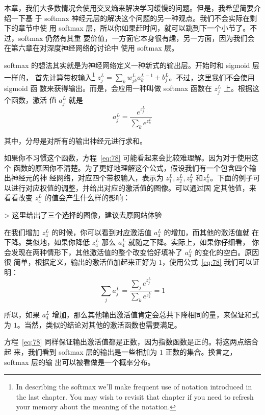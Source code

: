 本章，我们大多数情况会使用交叉熵来解决学习缓慢的问题。但是，我希望简要介绍一下基
于 softmax 神经元层的解决这个问题的另一种观点。我们不会实际在剩下的章节中使
用 softmax 层，所以你如果赶时间，就可以跳到下一个小节了。不过，softmax 仍然有其重
要价值，一方面它本身很有趣，另一方面，因为我们会在第六章在对深度神经网络的讨论中
使用 softmax 层。

softmax 的想法其实就是为神经网络定义一种新式的输出层。开始时和 sigmoid 层一样的，
首先计算带权输入\footnote{In describing the softmax we'll make frequent use of
  notation introduced in the last chapter. You may wish to revisit that chapter
  if you need to refresh your memory about the meaning of the notation.}
$z^L_j = \sum_{k} w^L_{jk} a^{L-1}_k + b^L_j$。不过，这里我们不会使用 sigmoid 函
数来获得输出。而是，会应用一种叫做 softmax 函数在 $z^L_j$ 上。根据这个函数，激活
值 $a^L_j$ 就是
\begin{equation} 
  a^L_j = \frac{e^{z^L_j}}{\sum_k e^{z^L_k}}
  \label{eq:78}\tag{78}
\end{equation}

其中，分母是对所有的输出神经元进行求和。

如果你不习惯这个函数，方程~\eqref{eq:78} 可能看起来会比较难理解。因为对于使用这个
函数的原因你不清楚。为了更好地理解这个公式，假设我们有一个包含四个输出神经元的神
经网络，对应四个带权输入，表示为 $z^L_1, z^L_2, z^L_3$
和$z^L_4$。下面的例子可以进行对应权值的调整，并给出对应的激活值的图像。可以通过固
定其他值，来看看改变 $z^L_4$ 的值会产生什么样的影响：

> 这里给出了三个选择的图像，建议去原网站体验

在我们增加 $z^L_4$ 的时候，你可以看到对应激活值 $a^L_4$ 的增加，而其他的激活值就
在下降。类似地，如果你降低 $z^L_4$ 那么 $a^L_4$ 就随之下降。实际上，如果你仔细看，
你会发现在两种情形下，其他激活值的整个改变恰好填补了 $a^L_4$ 的变化的空白。原因很
简单，根据定义，输出的激活值加起来正好为 $1$，使用公式~\eqref{eq:78} 我们可以证
明：
\begin{equation}
  \sum_j a^L_j = \frac{\sum_j e^{z^L_j}}{\sum_k e^{z^L_k}} = 1
  \label{eq:79}\tag{79}
\end{equation}

所以，如果 $a^L_4$ 增加，那么其他输出激活值肯定会总共下降相同的量，来保证和式
为 $1$。当然，类似的结论对其他的激活函数也需要满足。

方程~\eqref{eq:78} 同样保证输出激活值都是正数，因为指数函数是正的。将这两点结合起
来，我们看到 softmax 层的输出是一些相加为 $1$ 正数的集合。换言之，softmax 层的输
出可以被看做是一个概率分布。

